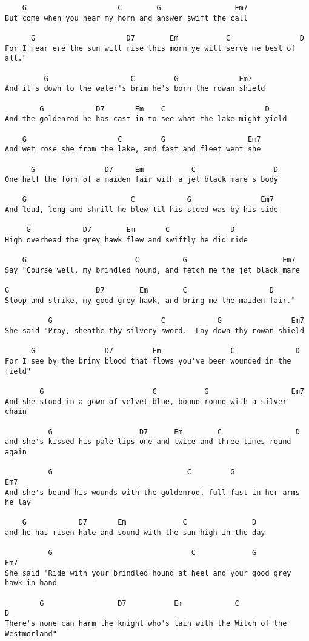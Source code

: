 \documentclass[leqno]{memoir}
\begin{document}
\begin{verbatim}
    G                     C        G                 Em7
But come when you hear my horn and answer swift the call

      G                     D7        Em           C                D
For I fear ere the sun will rise this morn ye will serve me best of all."

         G                   C         G              Em7
And it's down to the water's brim he's born the rowan shield

        G            D7       Em    C                       D
And the goldenrod he has cast in to see what the lake might yield

    G                     C         G                   Em7
And wet rose she from the lake, and fast and fleet went she

      G                D7     Em           C                  D
One half the form of a maiden fair with a jet black mare's body

    G                        C            G                Em7
And loud, long and shrill he blew til his steed was by his side

     G            D7        Em       C              D
High overhead the grey hawk flew and swiftly he did ride

    G                         C          G                      Em7
Say "Course well, my brindled hound, and fetch me the jet black mare

G                    D7        Em        C                   D
Stoop and strike, my good grey hawk, and bring me the maiden fair."

          G                         C            G                Em7
She said "Pray, sheathe thy silvery sword.  Lay down thy rowan shield

      G                D7         Em                C              D
For I see by the briny blood that flows you've been wounded in the field"

        G                         C           G                   Em7
And she stood in a gown of velvet blue, bound round with a silver chain

          G                    D7      Em        C                 D
and she's kissed his pale lips one and twice and three times round again

          G                               C         G                   Em7
And she's bound his wounds with the goldenrod, full fast in her arms he lay

    G            D7       Em             C               D
and he has risen hale and sound with the sun high in the day

          G                                C             G                 Em7
She said "Ride with your brindled hound at heel and your good grey hawk in hand

        G                 D7           Em            C                   D
There's none can harm the knight who's lain with the Witch of the Westmorland"

\end{verbatim}
\newpage
\end{document}

